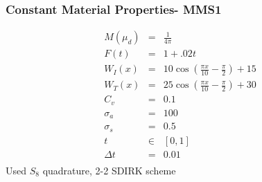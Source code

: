\documentclass{beamer}
\newcommand{\bea}{\begin{eqnarray*}}  %
\newcommand{\eea}{\end{eqnarray*}}
\begin{document}
\begin{frame}
\frametitle{Constant Material Properties- MMS1}
\bea
M(\mu_d) &=& \frac{1}{4\pi} \\
F(t) &=& 1+.02t \\
W_I(x) &=& 10 \cos\left( \frac{\pi x}{10} - \frac{\pi}{2} \right) + 15 \\
W_T(x) &=& 25 \cos\left( \frac{\pi x}{10} - \frac{\pi}{2} \right) + 30 \\
C_v &=& 0.1 \\
\sigma_a &=& 100 \\ 
\sigma_s &=& 0.5 \\
t &\in& [0,1] \\
\Delta t &=& 0.01 \\
\eea
Used $S_8$ quadrature, 2-2 SDIRK scheme
\end{frame}
\end{document}
